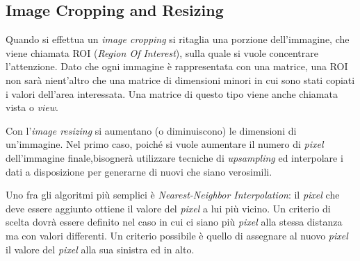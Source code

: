 % 
% 
% 
% 

\clearpage
\subsection {Image Cropping and Resizing}
Quando si effettua un \textit{image cropping} si ritaglia una porzione dell'immagine, che viene chiamata ROI (\textit{Region Of Interest}), sulla quale si vuole concentrare l'attenzione.
Dato che ogni immagine è rappresentata con una matrice, una ROI non sarà nient'altro che una matrice di dimensioni minori in cui sono stati copiati i valori dell'area interessata.
Una matrice di questo tipo viene anche chiamata vista o \textit{view}.

Con l'\textit{image resizing} si aumentano (o diminuiscono) le dimensioni di un'immagine.
Nel primo caso, poiché si vuole aumentare il numero di \textit{pixel} dell'immagine finale,bisognerà utilizzare tecniche di \textit{upsampling} ed interpolare i dati a disposizione per generarne di nuovi che siano verosimili.

Uno fra gli algoritmi più semplici è \textit{Nearest-Neighbor Interpolation}:
il \textit{pixel} che deve essere aggiunto ottiene il valore del \textit{pixel} a lui più vicino.
Un criterio di scelta dovrà essere definito nel caso in cui ci siano più \textit{pixel} alla stessa distanza ma con valori differenti.
Un criterio possibile è quello di assegnare al nuovo \textit{pixel} il valore del \textit{pixel} alla sua sinistra ed in alto.

